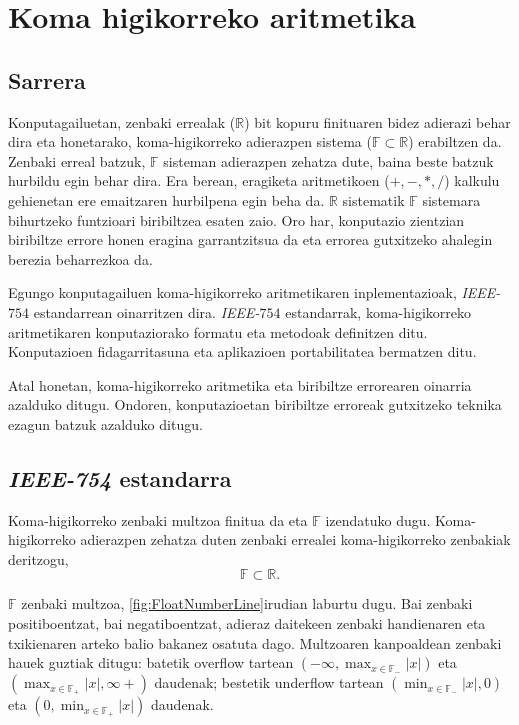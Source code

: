 \chapter{Koma higikorreko aritmetika}
\label{sec:4}

\section{Sarrera}

Konputagailuetan, zenbaki errealak ($\mathbb{R}$) bit kopuru finituaren bidez adierazi behar dira eta honetarako, koma-higikorreko adierazpen sistema ($\mathbb{F}\subset \mathbb{R}$) erabiltzen da. Zenbaki erreal batzuk, $\mathbb{F}$ sisteman adierazpen zehatza dute, baina beste batzuk hurbildu egin behar dira.  Era berean, eragiketa aritmetikoen ($+,-,*,/$) kalkulu gehienetan ere emaitzaren hurbilpena egin beha da. $\mathbb{R}$ sistematik $\mathbb{F}$ sistemara bihurtzeko funtzioari biribiltzea esaten zaio. Oro har, konputazio zientzian biribiltze errore honen eragina garrantzitsua da eta errorea gutxitzeko ahalegin berezia beharrezkoa da.

Egungo konputagailuen koma-higikorreko aritmetikaren inplementazioak, \emph{IEEE-$754$} estandarrean \cite{IEEE2008} oinarritzen dira. 
\emph{IEEE-$754$} estandarrak, koma-higikorreko aritmetikaren konputaziorako formatu eta metodoak definitzen ditu. Konputazioen fidagarritasuna eta aplikazioen portabilitatea bermatzen ditu.    
 
Atal honetan, koma-higikorreko aritmetika eta biribiltze errorearen oinarria azalduko ditugu. Ondoren, konputazioetan biribiltze erroreak gutxitzeko teknika ezagun batzuk azalduko ditugu. 

\section{\emph{IEEE-754} estandarra}

Koma-higikorreko zenbaki multzoa finitua da eta ${\mathbb{F}}$ izendatuko dugu. Koma-higikorreko adierazpen zehatza duten zenbaki errealei koma-higikorreko zenbakiak deritzogu, 
\begin{equation*}
\mathbb{F}\subset \mathbb{R}.
\end{equation*}

$\mathbb{F}$ zenbaki multzoa, \ref{fig:FloatNumberLine}irudian laburtu dugu. Bai zenbaki positiboentzat, bai negatiboentzat, adieraz daitekeen zenbaki handienaren eta txikienaren arteko balio bakanez osatuta dago. Multzoaren kanpoaldean zenbaki hauek guztiak ditugu: batetik overflow tartean $(-\infty,\max_{x \in \mathbb{F_{-}}}|x|)$  eta $(\max_{x \in \mathbb{F_{+}}}|x|,\infty+)$ daudenak; bestetik underflow tartean  $(\min_{x \in \mathbb{F_{-}}}|x|,0)$ eta $(0,\min_{x \in \mathbb{F_{+}}}|x|)$ daudenak. 

